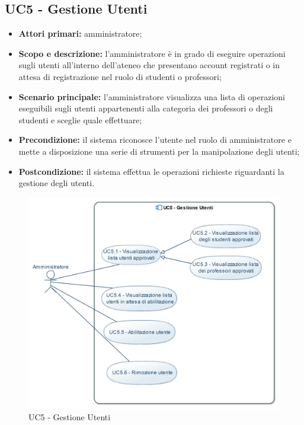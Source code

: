 \documentclass[AnalisiDeiRequisiti.tex]{subfiles}
\begin{document}
\subsection{UC5 - Gestione Utenti}
\begin{itemize}
	\item \textbf{Attori primari:} amministratore;
	\item \textbf{Scopo e descrizione:} l'amministratore è in grado di eseguire operazioni sugli utenti all'interno dell'ateneo che presentano account registrati o in attesa di registrazione nel ruolo di studenti o professori;
	\item \textbf{Scenario principale:} l'amministratore visualizza una lista di operazioni eseguibili sugli utenti appartenenti alla categoria dei professori o degli studenti e sceglie quale effettuare;
	\item \textbf{Precondizione:} il sistema riconosce l'utente nel ruolo di amministratore e mette a disposizione una serie di strumenti per la manipolazione degli utenti; 
	\item \textbf{Postcondizione:} il sistema effettua le operazioni richieste riguardanti la gestione degli utenti.
\end{itemize}
\begin{figure}[H]
	\centering
	\includegraphics[width=0.8\linewidth]{UC5.jpg}
	\caption{UC5 - Gestione Utenti}
	\label{fig:UC5 - Gestione Utenti}
\end{figure}
\end{document}

